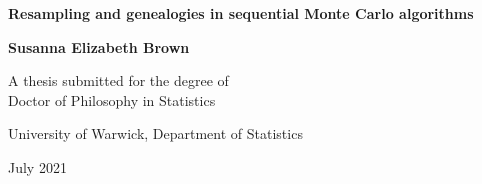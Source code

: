 \documentclass[oneside]{scrbook} %
\theoremstyle{definition}
\newcommand{\1}[1]{\mathbbm{1}_{#1}} %
\begin{document}
\begin{titlepage}
\centering
\vspace*{5cm}
\begin{LARGE}\bfseries
Resampling and genealogies in sequential Monte Carlo algorithms\par \end{LARGE} 
\vspace{1.5cm} 
\begin{Large}\bfseries
Susanna Elizabeth Brown\par
\end{Large}
\vspace{3cm}
\begin{large}
A thesis submitted for the degree of\\Doctor of Philosophy in Statistics \par
\vspace{1.5cm}
University of Warwick, Department of Statistics \par
\vspace{1.5cm}
July 2021 %
\end{large}
\end{titlepage}


\frontmatter

\tableofcontents
\listoffigures
\listoftables

\end{document}
